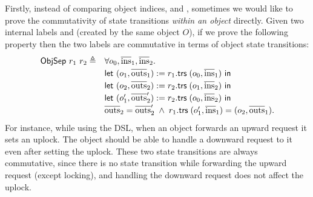 Firstly, instead of comparing object indices,  and , sometimes we would like to prove the commutativity of state transitions \emph{within an object} directly.
Given two internal labels  and  (created by the same object $O$), if we prove the following property then the two labels are commutative in terms of object state transitions:
\begin{displaymath}
  \renewcommand{\arraystretch}{1.2}
  \begin{array}{rl}
    \objsep{r_1}{r_2} \triangleq & \forall o_0, \listof{\mathrm{ins}}_1, \listof{\mathrm{ins}}_2.\\
    & \mathsf{let}\ (o_1, \listof{\mathrm{outs}}_1) := \rtrsOf{r_1}\;(o_0, \listof{\mathrm{ins}}_1)\ \mathsf{in}\\
    & \mathsf{let}\ (o_2, \listof{\mathrm{outs}}_2) := \rtrsOf{r_2}\;(o_1, \listof{\mathrm{ins}}_2)\ \mathsf{in}\\
    & \mathsf{let}\ (o_1', \listof{\mathrm{outs}}_2') := \rtrsOf{r_2}\;(o_0, \listof{\mathrm{ins}}_2)\ \mathsf{in}\\
    & \listof{\mathrm{outs}}_2 = \listof{\mathrm{outs}}_2' \;\wedge\;
    \rtrsOf{r_1}\;(o_1', \listof{\mathrm{ins}}_1) = (o_2, \listof{\mathrm{outs}}_1).
  \end{array}
\end{displaymath}
For instance, while using the \hemiola{} DSL, when an object forwards an upward request it sets an uplock.
The object should be able to handle a downward request to it even after setting the uplock.
These two state transitions are always commutative, since there is no state transition while forwarding the upward request (except locking), and handling the downward request does not affect the uplock.

